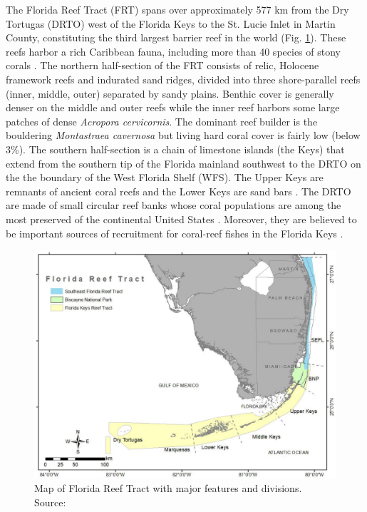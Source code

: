 The Florida Reef Tract (FRT) spans over approximately 577 km from the Dry Tortugas (DRTO) west of the Florida Keys to the St. Lucie Inlet in Martin County, constituting the third largest barrier reef in the world \citep{finkl2008shelf} (Fig. \ref{intro:frt}). These reefs harbor a rich Caribbean fauna, including more than 40 species of stony corals \citep{banks2008reef,jackson2014status}. The northern half-section of the FRT consists of relic, Holocene framework reefs and indurated sand ridges, divided into three shore-parallel reefs (inner, middle, outer) separated by sandy plains. Benthic cover is generally denser on the middle and outer reefs while the inner reef harbors some large patches of dense \textit{Acropora cervicornis}. The dominant reef builder is the bouldering \textit{Montastraea cavernosa} but living hard coral cover is fairly low (below 3\%)\citep{banks2008reef,walton2018impacts}. The southern half-section is a chain of limestone islands (the Keys) that extend from the southern tip of the Florida mainland southwest to the DRTO on the the boundary of the West Florida Shelf (WFS). The Upper Keys are remnants of ancient coral reefs and the Lower Keys are sand bars \citep{hoffmeister1968geology}. The DRTO are made of small circular reef banks whose coral populations are among the most preserved of the continental United States \citep{hine2008coral, kourafalou2018physical}. Moreover, they are believed to be important sources of recruitment for coral-reef fishes in the Florida Keys \citep{domeier2004potential}. 

\begin{figure}
    \centering
    \includegraphics[width=\textwidth]{chapters/intro/figures/frt.png}
    \caption{Map of Florida Reef Tract with major features and divisions. Source: \cite{kupfner2019untapped}}
    \label{intro:frt}
\end{figure}


